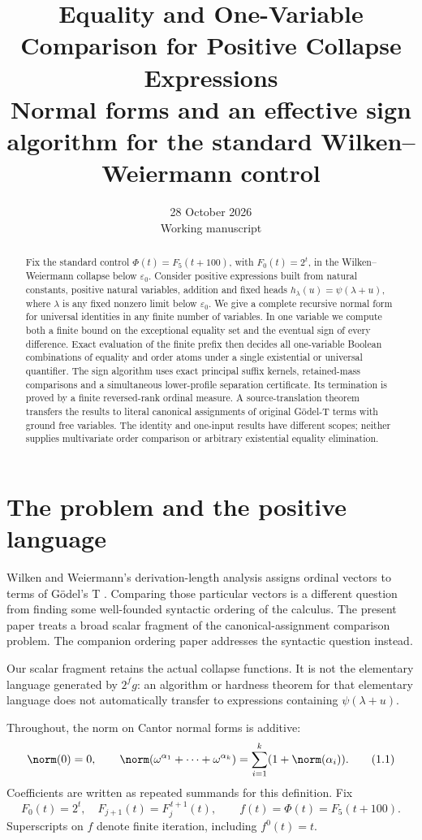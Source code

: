 \documentclass[11pt,a4paper]{article}
\title{Equality and One-Variable Comparison for Positive Collapse Expressions\\
Normal forms and an effective sign algorithm for the standard
Wilken--Weiermann control}
\author{}
\date{28 October 2026\\Working manuscript}
\begin{document}
\maketitle
\begin{abstract}
Fix the standard control $\Phi(t)=F_5(t+100)$, with $F_0(t)=2^t$, in the
Wilken--Weiermann collapse below $\varepsilon_0$.
Consider positive expressions built from natural constants, positive natural
variables, addition and fixed heads $h_\lambda(u)=\psi(\lambda+u)$, where
$\lambda$ is any fixed nonzero limit below $\varepsilon_0$.
We give a complete recursive normal form for universal identities in any
finite number of variables. In one variable we compute both a finite bound
on the exceptional equality set and the eventual sign of every difference.
Exact evaluation of the finite prefix then decides all one-variable Boolean
combinations of equality and order atoms under a single existential or
universal quantifier. The sign algorithm uses exact principal suffix kernels,
retained-mass comparisons and a simultaneous lower-profile separation
certificate. Its termination is proved by a finite reversed-rank ordinal
measure. A source-translation theorem transfers the results to literal
canonical assignments of original G\"odel-T terms with ground free variables.
The identity and one-input results have different scopes; neither supplies
multivariate order comparison or arbitrary existential equality elimination.
\end{abstract}
\tableofcontents

\section{The problem and the positive language}
Wilken and Weiermann's derivation-length analysis assigns ordinal vectors to
terms of G\"odel's T \cite{ww}. Comparing those particular vectors is a
different question from finding some well-founded syntactic ordering of
the calculus. The present paper treats a broad scalar fragment of the
canonical-assignment comparison problem. The companion ordering paper
\cite{wwordering} addresses the syntactic question instead.

Our scalar fragment retains the actual collapse functions. It is not the
elementary language generated by $2^f g$: an algorithm or hardness theorem
for that elementary language does not automatically transfer to expressions
containing $\psi(\lambda+u)$.

Throughout, the norm on Cantor normal forms is additive:
\[
 \norm(0)=0,\qquad
 \norm(\omega^{\alpha_1}+\cdots+\omega^{\alpha_k})
   =\sum_{i=1}^k(1+\norm(\alpha_i)).                 \tag{1.1}
\]
Coefficients are written as repeated summands for this definition. Fix
\[
 F_0(t)=2^t,\quad F_{j+1}(t)=F_j^{\,t+1}(t),\qquad
 f(t)=\Phi(t)=F_5(t+100).
\]
Superscripts on $f$ denote finite iteration, including $f^0(t)=t$.
\end{document}

